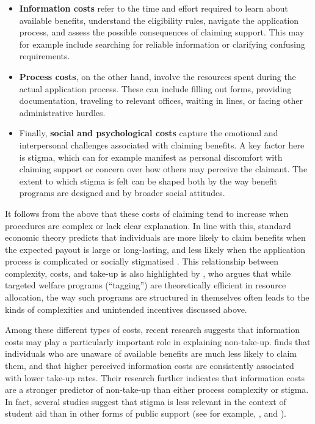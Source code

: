 \begin{itemize}
  \item \textbf{Information costs} refer to the time and effort required to learn about available benefits, understand the eligibility rules, navigate the application process, and assess the possible consequences of claiming support. This may for example include searching for reliable information or clarifying confusing requirements.
  \item \textbf{Process costs}, on the other hand, involve the resources spent during the actual application process. These can include filling out forms, providing documentation, traveling to relevant offices, waiting in lines, or facing other administrative hurdles.
  \item Finally, \textbf{social and psychological costs} capture the emotional and interpersonal challenges associated with claiming benefits. A key factor here is stigma, which can for example manifest as personal discomfort with claiming support or concern over how others may perceive the claimant. The extent to which stigma is felt can be shaped both by the way benefit programs are designed and by broader social attitudes.
\end{itemize}

It follows from the above that these costs of claiming tend to increase when procedures are complex or lack clear explanation. In line with this, standard economic theory predicts that individuals are more likely to claim benefits when the expected payout is large or long-lasting, and less likely when the application process is complicated or socially stigmatised \citep{janssens_totake_2022, booij_role_2012}. This relationship between complexity, costs, and take-up is also highlighted by \cite{akerlof_tagging_1978}, who argues that while targeted welfare programs (“tagging”) are theoretically efficient in resource allocation, the way such programs are structured in themselves often leads to the kinds of complexities and unintended incentives discussed above.

Among these different types of costs, recent research suggests that information costs may play a particularly important role in explaining non-take-up. \cite{bolland_information_nodate} finds that individuals who are unaware of available benefits are much less likely to claim them, and that higher perceived information costs are consistently associated with lower take-up rates. Their research further indicates that information costs are a stronger predictor of non-take-up than either process complexity or stigma. In fact, several studies suggest that stigma is less relevant in the context of student aid than in other forms of public support (see for example, \cite{konijn_quantifying_2023}, \cite{currie_takeup_2004} and \cite{bruckmeier_new_2012}).


